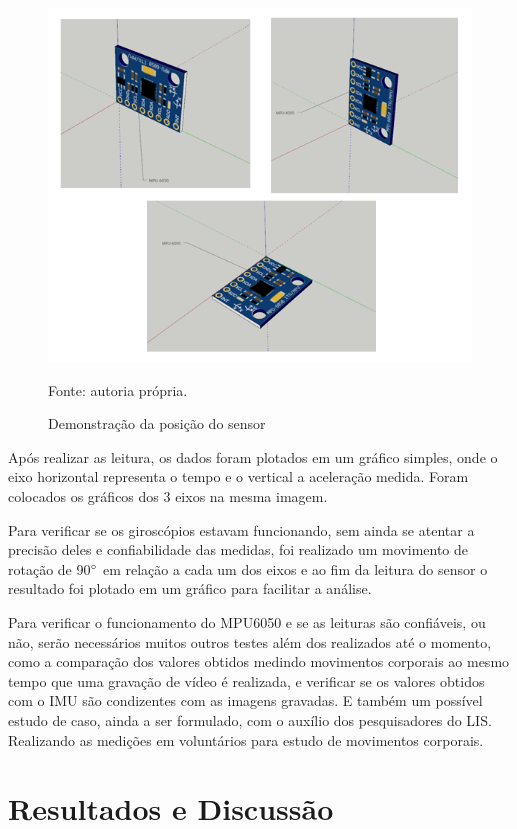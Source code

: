 	\begin{figure}[h]
		\centering
		\includegraphics[keepaspectratio=true,scale=1]{figuras/validacao_acel.PNG}
		\caption{Demonstração da posição do sensor}
		Fonte: autoria própria. 
		\label{acel_validation}	
	\end{figure}
	
	Após realizar as leitura, os dados foram plotados em um gráfico simples, onde o eixo horizontal representa o tempo e o vertical a aceleração medida. Foram colocados os gráficos dos 3 eixos na mesma imagem. 
	
	Para verificar se os giroscópios estavam funcionando, sem ainda se atentar a precisão deles e confiabilidade das medidas, foi realizado um movimento de rotação de 90$ \degree $ em relação a cada um dos eixos e ao fim da leitura do sensor o resultado foi plotado em um gráfico para facilitar a análise.
	
	Para verificar o funcionamento do MPU6050  e se as leituras são confiáveis, ou não, serão necessários muitos outros testes além dos realizados até o momento, como a comparação dos valores obtidos medindo movimentos corporais ao mesmo tempo que uma gravação de vídeo é realizada, e verificar se os valores obtidos com o IMU são condizentes com as imagens gravadas. E também um possível estudo de caso, ainda a ser formulado, com o auxílio dos pesquisadores do LIS. Realizando as medições em voluntários para estudo de movimentos corporais. 
	
	
\chapter{Resultados e Discussão}
